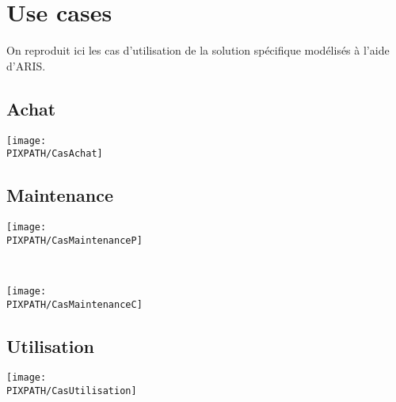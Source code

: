 \section{Use cases}

On reproduit ici les cas d'utilisation de la solution spécifique modélisés
à l'aide d'ARIS.

\subsection{Achat}

\begin{center}
\texttt{[image: \\PIXPATH/CasAchat]}
\end{center}

\subsection{Maintenance}

\begin{center}
\texttt{[image: \\PIXPATH/CasMaintenanceP]}
\end{center}

\hfill\\

\begin{center}
\texttt{[image: \\PIXPATH/CasMaintenanceC]}
\end{center}

\subsection{Utilisation}

\begin{center}
\texttt{[image: \\PIXPATH/CasUtilisation]}
\end{center}
